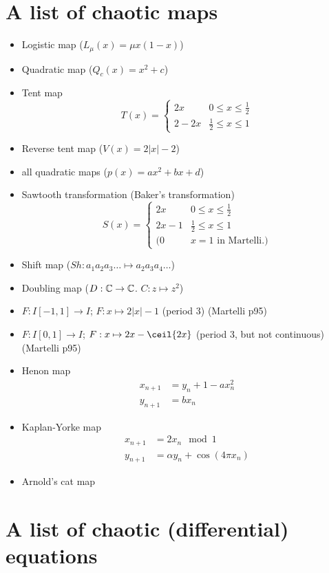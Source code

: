 \documentclass[11pt]{book}
\begin{document}
\section{A list of chaotic maps}
\begin{itemize}
  \item Logistic map ($L_\mu(x) = \mu x(1-x)$)
  \item Quadratic map ($Q_c(x) = x^2 + c$)
  \item Tent map 
    \begin{equation*}
      T(x) = 
      \begin{cases}
        2x & 0 \leq x \leq \frac{1}{2}      \\
        2 - 2x & \frac{1}{2} \leq x \leq 1
      \end{cases}
    \end{equation*}
  \item Reverse tent map ($V(x) = 2|x| - 2$)
  \item all quadratic maps ($p(x) = ax^2 + bx + d$)
  \item Sawtooth transformation (Baker's transformation)
    \begin{equation*}
      S(x) = 
      \begin{cases}
        2x     & 0 \leq x \leq \frac{1}{2}      \\
        2x - 1 & \frac{1}{2} \leq x \leq 1      \\
        (0 & x = 1 \mbox{ in Martelli.})
      \end{cases}
    \end{equation*}
  \item Shift map ($Sh: a_1a_2a_3\ldots \mapsto a_2a_3a_4\ldots$)
  \item Doubling map ($D: \mathbb{C} \to \mathbb{C}$. $C: z \mapsto z^2$)
  \item $F: I [-1,1] \to I$; $F: x \mapsto 2|x| - 1$ (period 3) (Martelli p95)
  \item $F: I [0,1] \to I$; $F: x \mapsto 2x - \ceil{2x}$ (period 3, but not continuous) (Martelli p95)
  \item Henon map
    \begin{align*}
      x_{n+1} &= y_n + 1 - ax_n^2 \\
      y_{n+1} &= bx_n
    \end{align*}
  \item Kaplan-Yorke map
    \begin{align*}
      x_{n+1} &= 2x_n \mod 1    \\
      y_{n+1} &= \alpha y_n + \cos(4\pi x_n)
    \end{align*}
  \item Arnold's cat map
\end{itemize}

\section{A list of chaotic (differential) equations}
\end{document}
